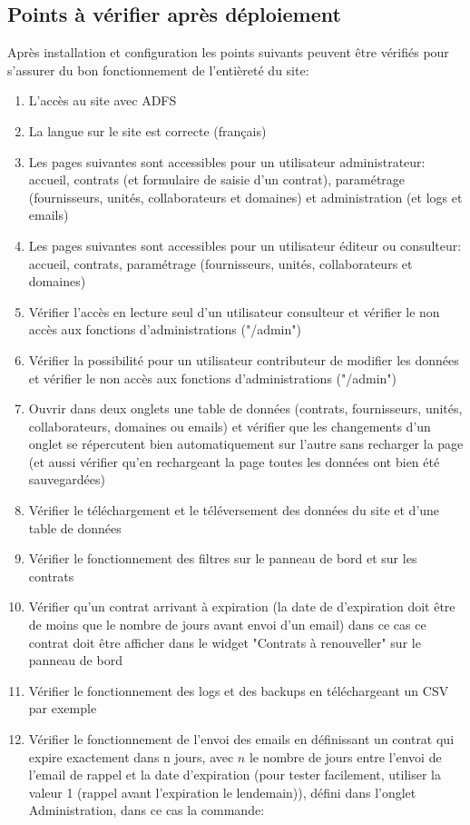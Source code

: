 \documentclass[10pt,a4paper]{article}
\begin{document}
{{{{{{{{{{{	\subsection{Points à vérifier après déploiement}
	
	Après installation et configuration les points suivants peuvent être vérifiés pour s'assurer du bon fonctionnement de l'entièreté du site:\
	
	\begin{enumerate}
		\item L'accès au site avec ADFS
		\item La langue sur le site est correcte (français)
		\item Les pages suivantes sont accessibles pour un utilisateur administrateur: accueil, contrats (et formulaire de saisie d'un contrat), paramétrage (fournisseurs, unités, collaborateurs et domaines) et administration (et logs et emails)
		\item Les pages suivantes sont accessibles pour un utilisateur éditeur ou consulteur: accueil, contrats, paramétrage (fournisseurs, unités, collaborateurs et domaines)
		\item Vérifier l'accès en lecture seul d'un utilisateur consulteur et vérifier le non accès aux fonctions d'administrations ("/admin")
		\item Vérifier la possibilité pour un utilisateur contributeur de modifier les données et vérifier le non accès aux fonctions d'administrations ("/admin")
		\item Ouvrir dans deux onglets une table de données (contrats, fournisseurs, unités, collaborateurs, domaines ou emails) et vérifier que les changements d'un onglet se répercutent bien automatiquement sur l'autre sans recharger la page (et aussi vérifier qu'en rechargeant la page toutes les données ont bien été sauvegardées)
		\item Vérifier le téléchargement et le téléversement des données du site et d'une table de données
		\item Vérifier le fonctionnement des filtres sur le panneau de bord et sur les contrats
		\item Vérifier qu'un contrat arrivant à expiration (la date de d'expiration doit être de moins que le nombre de jours avant envoi d'un email) dans ce cas ce contrat doit être afficher dans le widget "Contrats à renouveller" sur le panneau de bord
		\item Vérifier le fonctionnement des logs et des backups en téléchargeant un CSV par exemple
		\item Vérifier le fonctionnement de l'envoi des emails en définissant un contrat qui expire exactement dans n jours, avec $n$ le nombre de jours entre l'envoi de l'email de rappel et la date d'expiration (pour tester facilement, utiliser la valeur 1 (rappel avant l'expiration le lendemain)), défini dans l'onglet Administration, dans ce cas la commande:\\
		

\end{enumerate}}}}}}}}}}}}
\end{document}
